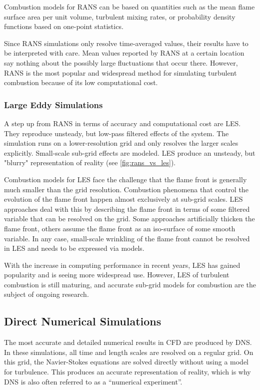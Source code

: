 %
Combustion models for \ac{RANS} can be based on quantities such as the mean
flame surface area per unit volume, turbulent mixing rates, or probability
density functions based on one-point statistics.
%

%
Since \ac{RANS} simulations only resolve time-averaged values, their results
have to be interpreted with care.
%
Mean values reported by \ac{RANS} at a certain location say nothing about the
possibly large fluctuations that occur there.
%
However, \ac{RANS} is the most popular and widespread method for simulating
turbulent combustion because of its low computational cost.
%
%
\subsubsection{Large Eddy Simulations} %
\label{ssub:les}
%
A step up from \ac{RANS} in terms of accuracy and computational cost are
\ac{LES}.
%
They reproduce unsteady, but low-pass filtered effects of the system.
%
The simulation runs on a lower-resolution grid and only resolves the larger
scales explicitly.
%
Small-scale sub-grid effects are modeled.
%
\ac{LES} produce an unsteady, but "blurry" representation of reality (see
\cref{fig:rans_vs_les}).
%

%
Combustion models for \ac{LES} face the challenge that the flame front is
generally much smaller than the grid resolution.
%
Combustion phenomena that control the evolution of the flame front happen almost
exclusively at sub-grid scales.
%
\ac{LES} approaches deal with this by describing the flame front in terms of
some filtered variable that can be resolved on the grid.
%
Some approaches artificially thicken the flame front, others assume the
flame front as an iso-surface of some smooth variable.
%
In any case, small-scale wrinkling of the flame front cannot be resolved in
\ac{LES} and needs to be expressed via models.
%

%
With the increase in computing performance in recent years, \ac{LES} has gained
popularity and is seeing more widespread use.
%
However, \ac{LES} of turbulent combustion is still maturing, and accurate
sub-grid models for combustion are the subject of ongoing research.
%
%
%
\subsection{Direct Numerical Simulations} %
\label{sub:direct_numerical_simulations}
%
The most accurate and detailed numerical results in \ac{CFD} are produced by
\ac{DNS}.
%
In these simulations, all time and length scales are resolved on a regular grid.
%
On this grid, the Navier-Stokes equations are solved directly without using a
model for turbulence.
%
This produces an accurate representation of reality, which is why \ac{DNS} is
also often referred to as a ``numerical experiment''.
%


